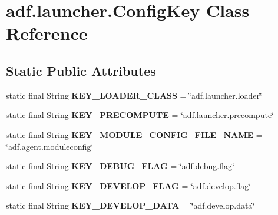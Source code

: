 \hypertarget{classadf_1_1launcher_1_1ConfigKey}{}\section{adf.\+launcher.\+Config\+Key Class Reference}
\label{classadf_1_1launcher_1_1ConfigKey}
\subsection*{Static Public Attributes}
\begin{DoxyCompactItemize}
\item 
\hypertarget{classadf_1_1launcher_1_1ConfigKey_a8d68cfb5604916c75bb5c9ee358210d3}{}\label{classadf_1_1launcher_1_1ConfigKey_a8d68cfb5604916c75bb5c9ee358210d3} 
static final String {\bfseries K\+E\+Y\+\_\+\+L\+O\+A\+D\+E\+R\+\_\+\+C\+L\+A\+SS} = \char`\"{}adf.\+launcher.\+loader\char`\"{}
\item 
\hypertarget{classadf_1_1launcher_1_1ConfigKey_aeff8ee3a58dab2e14a806b1fe6ec2b46}{}\label{classadf_1_1launcher_1_1ConfigKey_aeff8ee3a58dab2e14a806b1fe6ec2b46} 
static final String {\bfseries K\+E\+Y\+\_\+\+P\+R\+E\+C\+O\+M\+P\+U\+TE} = \char`\"{}adf.\+launcher.\+precompute\char`\"{}
\item 
\hypertarget{classadf_1_1launcher_1_1ConfigKey_acce20feb471139f0348ad4866261b485}{}\label{classadf_1_1launcher_1_1ConfigKey_acce20feb471139f0348ad4866261b485} 
static final String {\bfseries K\+E\+Y\+\_\+\+M\+O\+D\+U\+L\+E\+\_\+\+C\+O\+N\+F\+I\+G\+\_\+\+F\+I\+L\+E\+\_\+\+N\+A\+ME} = \char`\"{}adf.\+agent.\+moduleconfig\char`\"{}
\item 
\hypertarget{classadf_1_1launcher_1_1ConfigKey_a448fe3a17e611cdb9d553fcb91c768ea}{}\label{classadf_1_1launcher_1_1ConfigKey_a448fe3a17e611cdb9d553fcb91c768ea} 
static final String {\bfseries K\+E\+Y\+\_\+\+D\+E\+B\+U\+G\+\_\+\+F\+L\+AG} = \char`\"{}adf.\+debug.\+flag\char`\"{}
\item 
\hypertarget{classadf_1_1launcher_1_1ConfigKey_a7a34844fe20b06d3ae3d7ee3717eccdb}{}\label{classadf_1_1launcher_1_1ConfigKey_a7a34844fe20b06d3ae3d7ee3717eccdb} 
static final String {\bfseries K\+E\+Y\+\_\+\+D\+E\+V\+E\+L\+O\+P\+\_\+\+F\+L\+AG} = \char`\"{}adf.\+develop.\+flag\char`\"{}
\item 
\hypertarget{classadf_1_1launcher_1_1ConfigKey_a766ab160d3b6cc5dfbbf194cc7964a81}{}\label{classadf_1_1launcher_1_1ConfigKey_a766ab160d3b6cc5dfbbf194cc7964a81} 
static final String {\bfseries K\+E\+Y\+\_\+\+D\+E\+V\+E\+L\+O\+P\+\_\+\+D\+A\+TA} = \char`\"{}adf.\+develop.\+data\char`\"{}

\end{DoxyCompactItemize}
